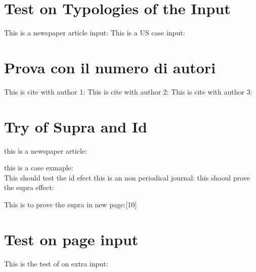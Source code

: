 \documentclass{article}
\begin{document}
\section{Test on Typologies of the Input} 
This is a newspaper article input:
This is a US case input:


\section{Prova con il numero di autori}

This is cite with author 1:
This is cite with author 2:
This is cite with author 3: 

\newpage

\section{Try of Supra and Id}



this is a newspaper article:


this is a case exmaple:\\
This should test the id efect
this is an non periodical journal:
this shooul prove the supra effect:

\newpage
This is to prove the supra in new page:[10]



\section{Test on page input}
This is the test of on extra input:
\end{document}
